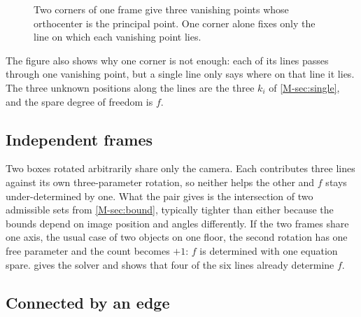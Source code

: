 \begin{figure}[t]
\centering

\caption{Two corners of one frame give three vanishing points whose orthocenter is the principal point. One corner alone fixes only the line on which each vanishing point lies.}
\label{fig:vp}
\end{figure}

The figure also shows why one corner is not enough: each of its lines passes through one vanishing point, but a single line only says where on that line it lies. The three unknown positions along the lines are the three $k_i$ of \cref{M-sec:single}, and the spare degree of freedom is $f$.

\subsection{Independent frames}

Two boxes rotated arbitrarily share only the camera. Each contributes three lines against its own three-parameter rotation, so neither helps the other and $f$ stays under-determined by one. What the pair gives is the intersection of two admissible sets from \cref{M-sec:bound}, typically tighter than either because the bounds depend on image position and angles differently. If the two frames share one axis, the usual case of two objects on one floor, the second rotation has one free parameter and the count becomes $+1$: $f$ is determined with one equation spare.  gives the solver and shows that four of the six lines already determine $f$.

\subsection{Connected by an edge}

